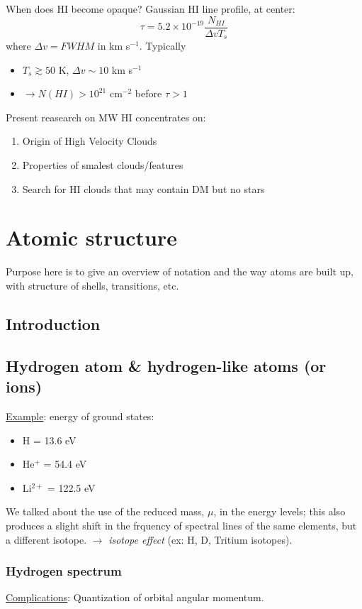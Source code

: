 \documentclass[11pt]{article}
\newcommand{\mar}[1]{\hspace{0pt}\marginpar{-\textcolor{black}{#1}-}}
\begin{document}
When does HI become opaque? Gaussian HI line profile, at center:
\[
    \tau = 5.2 \times 10^{-19} \frac{N_{HI}}{\Delta v T_{s}}
    \]
where $\Delta v = FWHM$ in km s$^{-1}$. Typically
\begin{itemize}
    \item $T_{s} \gtrsim 50$ K, $\Delta v \sim 10$ km s$^{-1}$
    \item $\rightarrow N(HI) > 10^{21}$ cm$^{-2}$ before $\tau > 1$
\end{itemize}

Present reasearch on MW HI concentrates on:
\begin{enumerate}
    \item Origin of High Velocity Clouds
    \item Properties of smalest clouds/features
    \item Search for HI clouds that may contain DM but no stars
\end{enumerate}

\newpage
\section{Atomic structure}
\mar{I 1}Purpose here is to give an overview of notation and the way
atoms are built up, with structure of shells, transitions, etc.

\subsection{Introduction}

\subsection{Hydrogen atom \& hydrogen-like atoms (or ions)}
\mar{I 2}\underline{Example}: energy of ground states:
\begin{itemize}
    \item H = 13.6 eV
    \item He$^{+}$ = 54.4 eV
    \item Li$^{2+}$ = 122.5 eV
\end{itemize}

\mar{I 3}We talked about the use of the reduced mass, $\mu$, in the energy
levels; this also produces a slight shift in the frquency of spectral lines
of the same elements, but a different isotope.
$\rightarrow$ \textit{isotope effect} (ex: H, D, Tritium isotopes).

\subsubsection{Hydrogen spectrum}
\underline{Complications}: Quantization of orbital angular momentum.
\end{document}
